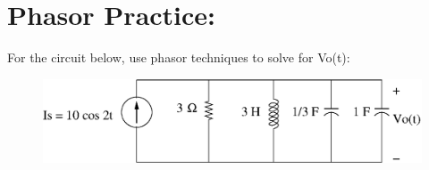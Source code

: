 \section{Phasor Practice:}
For the circuit below, use phasor techniques to solve for Vo(t):
\begin{figure}[h!]
\begin{minipage}[l]{0.85\linewidth}
\centering
\includegraphics[width=1.0\linewidth]{p1/p1.eps}
\end{minipage}
\end{figure}

